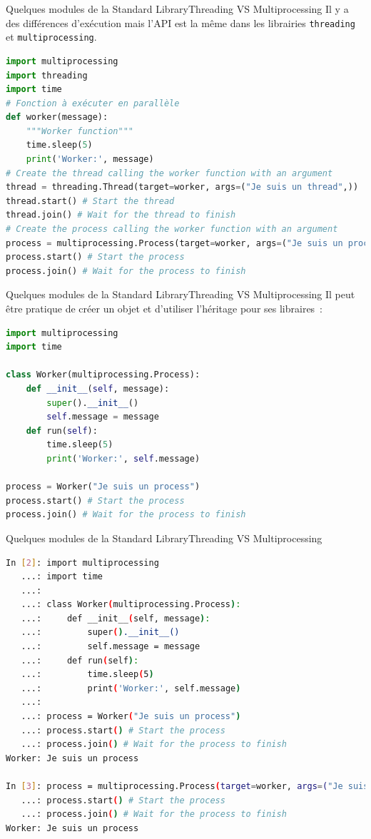 \documentclass{beamer}
\begin{document}
    \begin{frame}[fragile]{Quelques modules de la Standard Library}{Threading VS Multiprocessing}
        Il y a des différences d'exécution mais l'API est la même dans les librairies \lstinline{threading} et \lstinline{multiprocessing}.
        \begin{lstlisting}[language=Python]
import multiprocessing
import threading
import time
# Fonction à exécuter en parallèle
def worker(message):
    """Worker function"""
    time.sleep(5)
    print('Worker:', message)
# Create the thread calling the worker function with an argument
thread = threading.Thread(target=worker, args=("Je suis un thread",))
thread.start() # Start the thread
thread.join() # Wait for the thread to finish
# Create the process calling the worker function with an argument
process = multiprocessing.Process(target=worker, args=("Je suis un process",))
process.start() # Start the process
process.join() # Wait for the process to finish
        \end{lstlisting}
    \end{frame}

    \begin{frame}[fragile]{Quelques modules de la Standard Library}{Threading VS Multiprocessing}
        Il peut être pratique de créer un objet et d'utiliser l'héritage pour ses libraires~:
        \begin{lstlisting}[language=Python]
import multiprocessing
import time

class Worker(multiprocessing.Process):
    def __init__(self, message):
        super().__init__()
        self.message = message
    def run(self):
        time.sleep(5)
        print('Worker:', self.message)

process = Worker("Je suis un process")
process.start() # Start the process
process.join() # Wait for the process to finish
        \end{lstlisting}
    \end{frame}

    \begin{frame}[fragile]{Quelques modules de la Standard Library}{Threading VS Multiprocessing}
        \begin{lstlisting}[language=Bash]
In [2]: import multiprocessing
   ...: import time
   ...:
   ...: class Worker(multiprocessing.Process):
   ...:     def __init__(self, message):
   ...:         super().__init__()
   ...:         self.message = message
   ...:     def run(self):
   ...:         time.sleep(5)
   ...:         print('Worker:', self.message)
   ...:
   ...: process = Worker("Je suis un process")
   ...: process.start() # Start the process
   ...: process.join() # Wait for the process to finish
Worker: Je suis un process

In [3]: process = multiprocessing.Process(target=worker, args=("Je suis un process",))
   ...: process.start() # Start the process
   ...: process.join() # Wait for the process to finish
Worker: Je suis un process
        \end{lstlisting}
    \end{frame}
\end{document}
